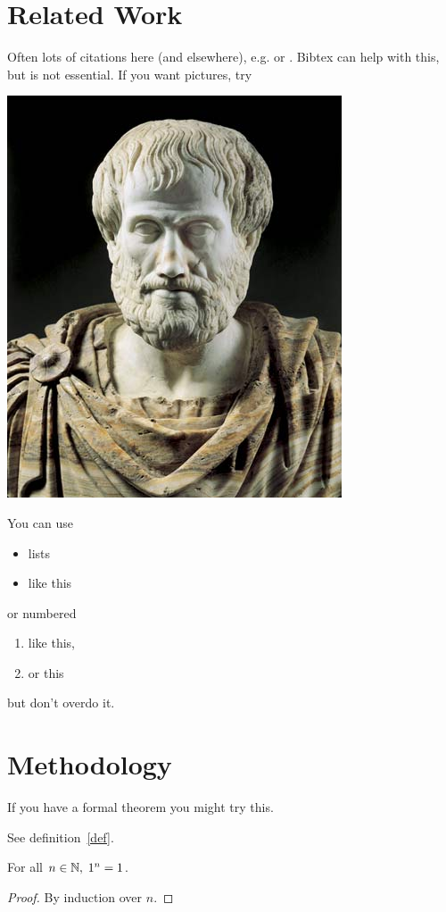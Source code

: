 \chapter{Related Work}
Often lots of citations here (and elsewhere), e.g. \cite{einstein} or \cite[Theorem 2.3]{knuthwebsite}.   Bibtex can help with this, but is not essential. If you want pictures, try

\begin{center}
\includegraphics[scale=.5]{imgs/aristotle}
\end{center}
You can use 
\begin{itemize}
\item lists
\item like this
\end{itemize}
or numbered
\begin{enumerate}
\item like this,
\item or this
\end{enumerate}
but don't overdo it.
\chapter{Methodology}
If you have a formal theorem you might try this.
\begin{definition}\label{def}
See definition~\ref{def}.
\end{definition}
\begin{theorem}
For all $n\in\mbox{\( \mathbb N \)},\; 1^n=1$.
\end{theorem}
\begin{proof}
By induction over $n$.
\end{proof}